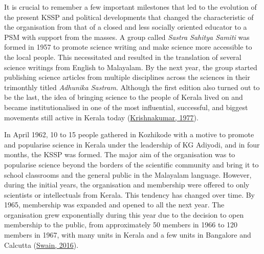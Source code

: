 \documentclass[twoside, 13pt]{article}
\begin{document}
{{\fontsize{12}{14}\selectfont It is crucial to remember a few important milestones that led to the evolution of the present KSSP and political developments that changed the characteristic of the organisation from that of a closed and less socially oriented educator to a PSM with support from the masses. A group called \textit{Sastra Sahitya Samiti} was formed in 1957 to promote science writing and make science more accessible to the local people. This necessitated and resulted in the translation of several science writings from English to Malayalam. By the next year, the group started publishing science articles from multiple disciplines across the sciences in their trimonthly titled \textit{Adhunika Sastram}. Although the first edition also turned out to be the last, the idea of bringing science to the people of Kerala lived on and became institutionalised in one of the most influential, successful, and biggest movements still active in Kerala today (\underline{Krishnakumar, 1977}). 

In April 1962, 10 to 15 people gathered in Kozhikode with a motive to promote and popularise science in Kerala under the leadership of KG Adiyodi, and in four months, the KSSP was formed. The major aim of the organisation was to popularise science beyond the borders of the scientific community and bring it to school classrooms and the general public in the Malayalam language. However, during the initial years, the organisation and membership were offered to only scientists or intellectuals from Kerala. This tendency has changed over time. By 1965, membership was expanded and opened to all the next year. The organisation grew exponentially during this year due to the decision to open membership to the public, from approximately 50 members in 1966 to 120 members in 1967, with many units in Kerala and a few units in Bangalore and Calcutta (\underline{Swain, 2016}). 

}}
\end{document}
